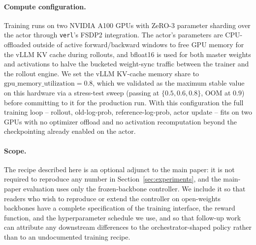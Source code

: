 \paragraph{Compute configuration.}
Training runs on two NVIDIA A100 GPUs with ZeRO-3 parameter sharding over the actor through \texttt{verl}'s FSDP2 integration. The actor's parameters are CPU-offloaded outside of active forward/backward windows to free GPU memory for the vLLM KV cache during rollouts, and bfloat16 is used for both master weights and activations to halve the bucketed weight-sync traffic between the trainer and the rollout engine. We set the vLLM KV-cache memory share to $\mathrm{gpu\_memory\_utilization}=0.8$, which we validated as the maximum stable value on this hardware via a stress-test sweep (passing at $\{0.5, 0.6, 0.8\}$, OOM at $0.9$) before committing to it for the production run. With this configuration the full training loop -- rollout, old-log-prob, reference-log-prob, actor update -- fits on two GPUs with no optimizer offload and no activation recomputation beyond the checkpointing already enabled on the actor.

\paragraph{Scope.}
The recipe described here is an optional adjunct to the main paper: it is not required to reproduce any number in Section~\ref{sec:experiments}, and the main-paper evaluation uses only the frozen-backbone controller. We include it so that readers who wish to reproduce or extend the \our{} controller on open-weights backbones have a complete specification of the training interface, the reward function, and the hyperparameter schedule we use, and so that follow-up work can attribute any downstream differences to the orchestrator-shaped policy rather than to an undocumented training recipe.
